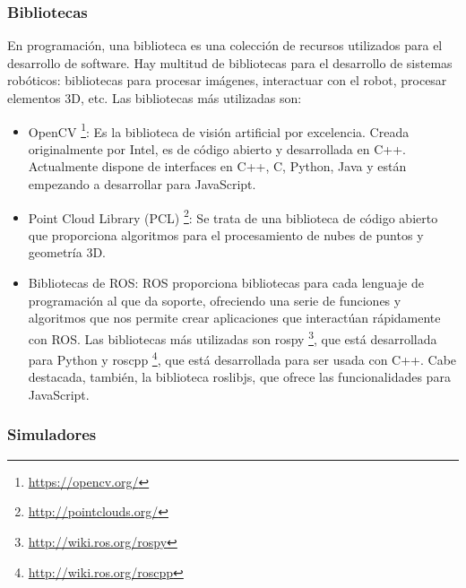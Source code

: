 \subsubsection{Bibliotecas}

En programación, una biblioteca es una colección de recursos utilizados para el desarrollo de software. Hay multitud de bibliotecas para el desarrollo de sistemas robóticos: bibliotecas para procesar imágenes, interactuar con el robot, procesar elementos 3D, etc. Las bibliotecas más utilizadas son:
\begin{itemize}
	\item OpenCV \footnote{\url{https://opencv.org/}}: Es la biblioteca de visión artificial por excelencia. Creada originalmente por Intel, es de código abierto y desarrollada en C++. Actualmente dispone de interfaces en C++, C, Python, Java y están empezando a desarrollar para JavaScript.
	\item Point Cloud Library (PCL) \footnote{\url{http://pointclouds.org/}}: Se trata de una biblioteca de código abierto que proporciona algoritmos para el procesamiento de nubes de puntos y geometría 3D.
	\item Bibliotecas de ROS: ROS proporciona bibliotecas para cada lenguaje de programación al que da soporte, ofreciendo una serie de funciones y algoritmos que nos permite crear aplicaciones que interactúan rápidamente con ROS. Las bibliotecas más utilizadas son rospy \footnote{\url{http://wiki.ros.org/rospy}}, que está desarrollada para Python y roscpp \footnote{\url{http://wiki.ros.org/roscpp}}, que está desarrollada para ser usada con C++. Cabe destacada, también, la biblioteca roslibjs, que ofrece las funcionalidades para JavaScript.
\end{itemize}

\subsubsection{Simuladores}


